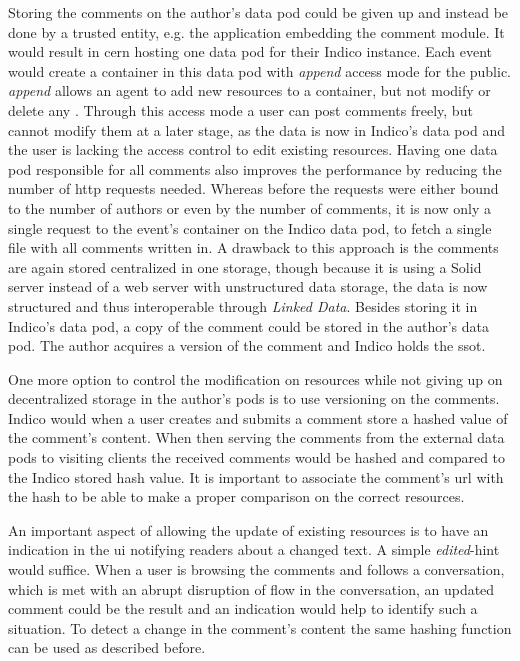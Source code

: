 Storing the comments on the author's data pod could be given up and instead be done by a trusted entity, e.g. the application embedding the comment module. It would result in \gls{cern} hosting one data pod for their Indico instance. Each event would create a container in this data pod with \textit{append} access mode for the public. \textit{append} allows an agent to add new resources to a container, but not modify or delete any \cite{solid-protocol}. Through this access mode a user can post comments freely, but cannot modify them at a later stage, as the data is now in Indico's data pod and the user is lacking the access control to edit existing resources. Having one data pod responsible for all comments also improves the performance by reducing the number of \gls{http} requests needed. Whereas before the requests were either bound to the number of authors or even by the number of comments, it is now only a single request to the event's container on the Indico data pod, to fetch a single file with all comments written in. A drawback to this approach is the comments are again stored centralized in one storage, though because it is using a Solid server instead of a web server with unstructured data storage, the data is now structured and thus interoperable through \textit{Linked Data}. Besides storing it in Indico's data pod, a copy of the comment could be stored in the author's data pod. The author acquires a version of the comment and Indico holds the \gls{ssot}.

One more option to control the modification on resources while not giving up on decentralized storage in the author's pods is to use versioning on the comments. Indico would when a user creates and submits a comment store a hashed value of the comment's content. When then serving the comments from the external data pods to visiting clients the received comments would be hashed and compared to the Indico stored hash value. It is important to associate the comment's \gls{url} with the hash to be able to make a proper comparison on the correct resources.

An important aspect of allowing the update of existing resources is to have an indication in the \gls{ui} notifying readers about a changed text. A simple \textit{edited}-hint would suffice. When a user is browsing the comments and follows a conversation, which is met with an abrupt disruption of flow in the conversation, an updated comment could be the result and an indication would help to identify such a situation.  To detect a change in the comment's content the same hashing function can be used as described before.
\vspace{0.5cm}
